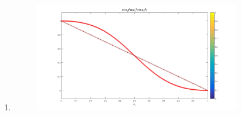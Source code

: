 \begin{enumerate}
\begin{enumerate}
    \item 	
	\begin{figure}[ht!]
	\centering
	\includegraphics[width=90mm]{Error_2.png}
	\end{figure}


      
  \end{enumerate}
\end{enumerate}
